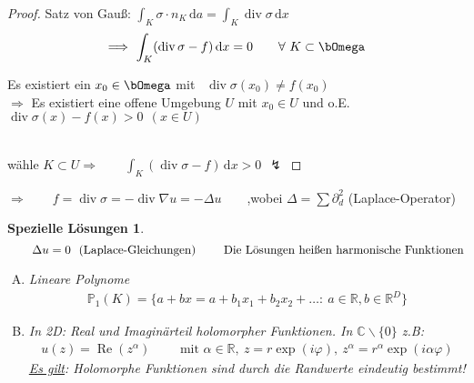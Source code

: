 \documentclass[12pt,twoside,reqno]{article}
\newcommand{\dx}{\,\mathrm{d}x}
\newcommand{\da}{\,\mathrm{d}a}
\renewcommand\div{\operatorname{div}}
\renewcommand\Re{\operatorname*{Re}}
\renewcommand{\Omega}{\bOmega}
\newcommand{\R}{\mathbb{R}}
\newcommand{\C}{\mathbb{C}}
\renewcommand{\P}{\mathbb{P}}
\theoremstyle{TheoWieners}
\theoremstyle{break}
\theoremstyle{app}
\newtheorem{Spezielle Lösungen}[app]{Spezielle Lösungen}
\newtheorem{Spezielle Lösungen der Poisson-Gleichung}[app]{Spezielle Lösungen der Poisson-Gleichung}
\newtheorem{Kartesische Gitter in 2-d}[app]{Kartesische Gitter in 2-d}
\newtheorem{Diskretisierungen hoher Ordnung}[app]{Diskretisierungen hoher Ordnung}
\newtheorem{Zyklische Reduktion}[app]{Zyklische Reduktion}
\begin{document}
\begin{proof}
   Satz von Gau\ss : $\int_{K} \sigma \cdot n_{K} \da = \int_{K} \div \sigma \dx$
    \begin{eqnarray*}
        \Longrightarrow \ \int_{K} (\div \sigma-f) \dx = 0 \qquad \forall \ K\subset \Omega
    \end{eqnarray*}
   \begin{ann}
   Es existiert ein $x_0 \in \Omega$ mit \ $\div \sigma (x_0) \neq f(x_0)$\\ $\Rightarrow$ Es existiert eine offene Umgebung $U$ mit $x_0 \in U$ und o.E. \ $\div \sigma (x) - f(x) > 0 \ \ (x\in U)$
\end{ann}\\ \newline
wähle $K \subset U \Rightarrow \qquad \int_{K} (\div \sigma-f) \dx > 0 \ \ \lightning$
\end{proof}


$\Longrightarrow \qquad f = \div \sigma = - \div \nabla u = - \Delta u \qquad$,wobei $\Delta = \sum \partial^2_d$ (Laplace-Operator)

\begin{Spezielle Lösungen}
$$
\qquad    \Delta u = 0 \ \text{ (Laplace-Gleichungen) \qquad Die Lösungen hei\ss en harmonische Funktionen} $$


\begin{enumerate}[A)]
    \item 	
	Lineare Polynome
	\begin{eqnarray*}
           \P_1(K)= \big\{ a+bx = a+b_1 x_1 + b_2 x_2 + \ldots : \ a \in \R, b\in \R^D \big\}
	\end{eqnarray*}
	     \item
	In 2D: Real und Imaginärteil holomorpher Funktionen. In $\C \backslash \{ 0 \} $ z.B:
	\begin{eqnarray*}
            u(z) =\Re (z^\alpha) \qquad \text{ mit } \alpha \in \R, \ z=r \exp (i \varphi), \ z^\alpha=r^\alpha \exp (i \alpha \varphi)
	\end{eqnarray*}
    \underline{Es gilt}: Holomorphe Funktionen sind durch die Randwerte eindeutig bestimmt! 
    	\end{enumerate}

\end{Spezielle Lösungen}
\end{document}
